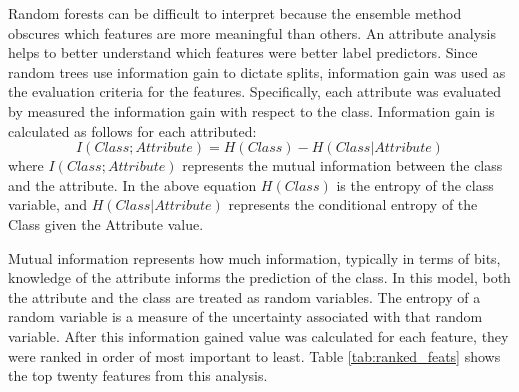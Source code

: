 \documentclass{article}
\begin{document}
\par
Random forests can be difficult to interpret because the ensemble method obscures which features are more meaningful than others.  An attribute analysis helps to better understand which features were better label predictors.  Since random trees use information gain to dictate splits, information gain was used as the evaluation criteria for the features.  Specifically, each attribute was evaluated by measured the information gain with respect to the class.  Information gain is calculated as follows for each attributed:
\begin{equation}
I(Class; Attribute) = H(Class) - H(Class | Attribute)
\end{equation} \label{eq:info_gained}
where $I(Class; Attribute)$ represents the mutual information between the class and the attribute.  In the above equation $H(Class)$ is the entropy of the class variable, and  $H(Class | Attribute)$ represents the conditional entropy of the Class given the Attribute value.  

Mutual information represents how much information, typically in terms of bits, knowledge of the attribute informs the prediction of the class.  In this model, both the attribute and the class are treated as random variables.  The entropy of a random variable is a measure of the uncertainty associated with that random variable. After this information gained value was calculated for each feature, they were ranked in order of most important to least.  Table \ref{tab:ranked_feats} shows the top twenty features from this analysis.
\end{document}
